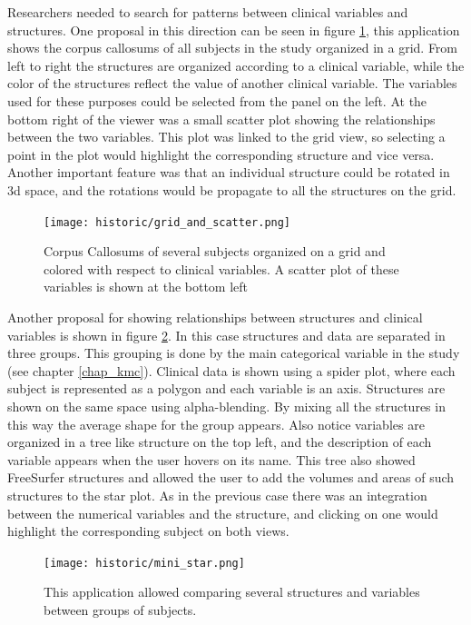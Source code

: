 Researchers needed to search for patterns between clinical variables and structures. One proposal in this direction can be seen in figure \ref{fig_grid}, this application shows the corpus callosums of all subjects in the study organized in a grid. From left to right the structures are organized according to a clinical variable, while the color of the structures reflect the value of another clinical variable. The variables used for these purposes could be selected from the panel on the left. At the bottom right of the viewer was a small scatter plot showing the relationships between the two variables. This plot was linked to the grid view, so selecting a point in the plot would highlight the corresponding structure and vice versa. Another important feature was that an individual structure could be rotated in 3d space, and the rotations would be propagate to all the structures on the grid.

\begin{figure}
\centering
\texttt{[image: historic/grid\_and\_scatter.png]}
\caption{\label{fig_grid}Corpus Callosums of several subjects organized on a grid and colored with respect to clinical variables.
A scatter plot of these variables is shown at the bottom left}
\end{figure}

Another proposal for showing relationships between structures and clinical variables is shown in figure \ref{fig_star_1}. In this case structures and data are separated in three groups. This grouping is done by the main categorical variable in the study (see chapter \ref{chap_kmc}). Clinical data is shown using a spider plot, where each subject is represented as a polygon and each variable is an axis. Structures are shown on the same space using alpha-blending. By mixing all the structures in this way the average shape for the group appears. Also notice variables are organized in a tree like structure on the top left, and the description of each variable appears when the user hovers on its name. This tree also showed FreeSurfer structures and allowed the user to add the volumes and areas of such structures to the star plot. As in the previous case there was an integration between the numerical variables and the structure, and clicking on one would highlight the corresponding subject on both views.

\begin{figure}
\centering
\texttt{[image: historic/mini\_star.png]}
\caption{\label{fig_star_1}This application allowed comparing several structures and variables between groups of subjects.}
\end{figure}

